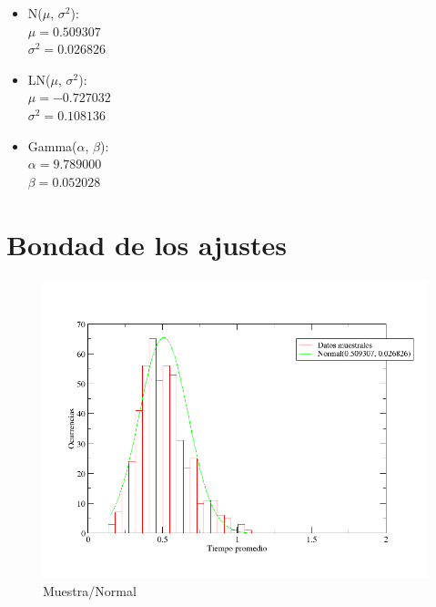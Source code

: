 \documentclass[10pt,a4paper]{article}
\begin{document}
\begin{itemize}
  \item N($\mu$, $\sigma^{2}$): \\
    $\mu = 0.509307$ \\
    $\sigma^{2} = 0.026826$
  \item LN($\mu$, $\sigma^{2}$): \\
    $\mu = -0.727032$ \\
    $\sigma^{2} = 0.108136$
  \item Gamma($\alpha$, $\beta$): \\
    $\alpha = 9.789000$ \\
    $\beta = 0.052028$
\end{itemize}

\section{Bondad de los ajustes}



\begin{figure}
  \centering
  \includegraphics[scale=0.5]{freq-normal.png} 
  \caption{Muestra/Normal}
  \label{freq-normal}
\end{figure}
\end{document}
